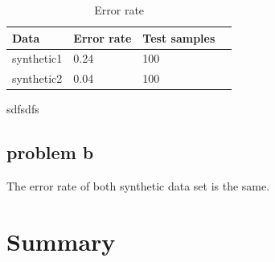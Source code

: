 \documentclass{article}
\begin{document}
		\begin{table}[hbt!]
		\begin{center}
		\begin{tabular}{| l | l | l | p{5cm} |}
		\hline
			Data      & Error rate & Test samples  \\ \hline
			synthetic1& 0.24        & 100    \\  \hline
			synthetic2& 0.04		& 100    \\   \hline
		\end{tabular}
		\end{center}
	\caption{Error rate}
	\label{table: errorrate}
	\end{table}
sdfsdfs \\
	\subsection{problem b}
The error rate of both synthetic data set is the same.  
	\section{Summary}
	
\end{document}
